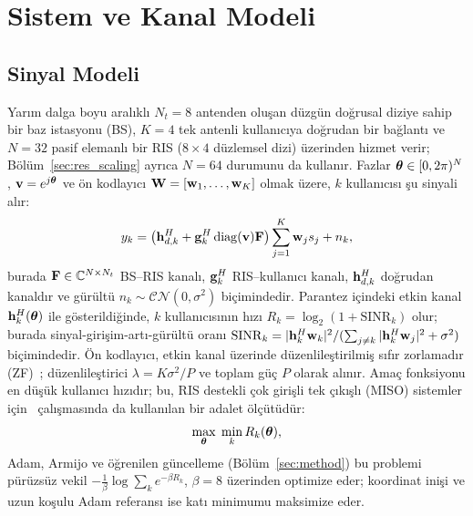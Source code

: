 \section{Sistem ve Kanal Modeli}
\label{sec:system}

\subsection{Sinyal Modeli}
Yarım dalga boyu aralıklı $N_t=8$ antenden oluşan düzgün doğrusal diziye sahip bir baz istasyonu (BS), $K=4$ tek antenli kullanıcıya doğrudan bir bağlantı ve $N=32$ pasif elemanlı bir RIS ($8\times 4$ düzlemsel dizi) üzerinden hizmet verir; Bölüm~\ref{sec:res_scaling} ayrıca $N=64$ durumunu da kullanır. Fazlar $\boldsymbol{\theta}\in[0,2\pi)^N$, $\mathbf{v}=e^{j\boldsymbol{\theta}}$ ve ön kodlayıcı $\mathbf{W}=[\mathbf{w}_1,\dots,\mathbf{w}_K]$ olmak üzere, $k$ kullanıcısı şu sinyali alır:
\begin{equation}
    y_k = \left(\mathbf{h}_{d,k}^H + \mathbf{g}_k^H \operatorname{diag}(\mathbf{v})\mathbf{F}\right)\sum_{j=1}^K \mathbf{w}_j s_j + n_k ,
    \label{eq:signal}
\end{equation}
burada $\mathbf{F}\in\mathbb{C}^{N\times N_t}$ BS--RIS kanalı, $\mathbf{g}_k^H$ RIS--kullanıcı kanalı, $\mathbf{h}_{d,k}^H$ doğrudan kanaldır ve gürültü $n_k\sim\mathcal{CN}(0,\sigma^2)$ biçimindedir. Parantez içindeki etkin kanal $\mathbf{h}_k^H(\boldsymbol{\theta})$ ile gösterildiğinde, $k$ kullanıcısının hızı $R_k=\log_2(1+\mathrm{SINR}_k)$ olur; burada sinyal-girişim-artı-gürültü oranı $\mathrm{SINR}_k = |\mathbf{h}_k^H \mathbf{w}_k|^2/(\sum_{j\ne k}|\mathbf{h}_k^H \mathbf{w}_j|^2 + \sigma^2)$ biçimindedir. Ön kodlayıcı, etkin kanal üzerinde düzenlileştirilmiş sıfır zorlamadır (ZF)~\cite{Peel2005TCOM}; düzenlileştirici $\lambda = K\sigma^2/P$ ve toplam güç $P$ olarak alınır. Amaç fonksiyonu en düşük kullanıcı hızıdır; bu, RIS destekli çok girişli tek çıkışlı (MISO) sistemler için~\cite{Nadeem2020TWC} çalışmasında da kullanılan bir adalet ölçütüdür:
\begin{equation}
    \max_{\boldsymbol{\theta}} \; \min_k R_k(\boldsymbol{\theta}),
    \label{eq:maxmin}
\end{equation}
Adam, Armijo ve öğrenilen güncelleme (Bölüm~\ref{sec:method}) bu problemi pürüzsüz vekil $-\tfrac{1}{\beta}\log\sum_k e^{-\beta R_k}$, $\beta=8$ üzerinden optimize eder; koordinat inişi ve uzun koşulu Adam referansı ise katı minimumu maksimize eder.

